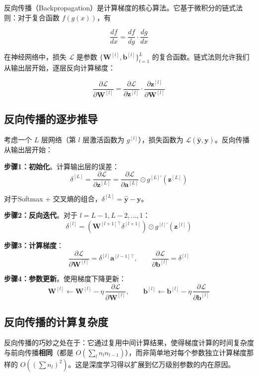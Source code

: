 反向传播（Backpropagation）是计算梯度的核心算法。它基于微积分的链式法则：对于复合函数 $f(g(x))$，有

\[
\frac{df}{dx} = \frac{df}{dg} \cdot \frac{dg}{dx}
\]

在神经网络中，损失 $\mathcal{L}$ 是参数 $\{\mathbf{W}^{[l]}, \mathbf{b}^{[l]}\}_{l=1}^{L}$ 的复合函数。链式法则允许我们从输出层开始，逐层反向计算梯度：

\[
\frac{\partial\mathcal{L}}{\partial\mathbf{W}^{[l]}} = \frac{\partial\mathcal{L}}{\partial\mathbf{z}^{[l]}} \cdot \frac{\partial\mathbf{z}^{[l]}}{\partial\mathbf{W}^{[l]}}
\]

\subsection{反向传播的逐步推导}

考虑一个 $L$ 层网络（第 $l$ 层激活函数为 $g^{[l]}$），损失函数为 $\mathcal{L}(\hat{\mathbf{y}}, \mathbf{y})$。反向传播从输出层开始：

\textbf{步骤1：初始化}。计算输出层的误差：
\[
\delta^{[L]} = \frac{\partial\mathcal{L}}{\partial\mathbf{z}^{[L]}} = \frac{\partial\mathcal{L}}{\partial\mathbf{a}^{[L]}} \odot g^{[L]\prime}(\mathbf{z}^{[L]})
\]

对于Softmax + 交叉熵的组合，$\delta^{[L]} = \hat{\mathbf{y}} - \mathbf{y}$。

\textbf{步骤2：反向迭代}。对于 $l = L-1, L-2, \dots, 1$：
\[
\delta^{[l]} = \left(\mathbf{W}^{[l+1]\top}\delta^{[l+1]}\right) \odot g^{[l]\prime}(\mathbf{z}^{[l]})
\]

\textbf{步骤3：计算梯度}：
\[
\frac{\partial\mathcal{L}}{\partial\mathbf{W}^{[l]}} = \delta^{[l]}\mathbf{a}^{[l-1]\top}, \qquad
\frac{\partial\mathcal{L}}{\partial\mathbf{b}^{[l]}} = \delta^{[l]}
\]

\textbf{步骤4：参数更新}。使用梯度下降更新：
\[
\mathbf{W}^{[l]} \leftarrow \mathbf{W}^{[l]} - \eta\,\frac{\partial\mathcal{L}}{\partial\mathbf{W}^{[l]}}, \qquad
\mathbf{b}^{[l]} \leftarrow \mathbf{b}^{[l]} - \eta\,\frac{\partial\mathcal{L}}{\partial\mathbf{b}^{[l]}}
\]

\subsection{反向传播的计算复杂度}

反向传播的巧妙之处在于：它通过复用中间计算结果，使得梯度计算的时间复杂度与前向传播\textbf{相同}（都是 $O(\sum_{l} n_l n_{l-1})$），而非简单地对每个参数独立计算梯度那样的 $O((\sum n_l)^2)$。这是深度学习得以扩展到亿万级别参数的内在原因。

